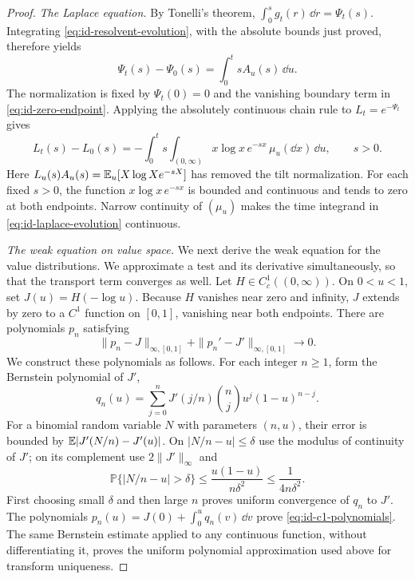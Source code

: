 \begin{proof}
\medskip\noindent\emph{The Laplace equation.}
By Tonelli's theorem, $\int_0^s g_t(r)\,\dd r=\Psi_t(s)$.
Integrating \eqref{eq:id-resolvent-evolution}, with the absolute bounds just proved, therefore yields
\begin{equation}
 \Psi_t(s)-\Psi_0(s)=\int_0^t sA_u(s)\,\dd u.
 \label{eq:id-exponent-evolution}
\end{equation}
The normalization is fixed by $\Psi_t(0)=0$ and the vanishing boundary term in \eqref{eq:id-zero-endpoint}.
Applying the absolutely continuous chain rule to $L_t=e^{-\Psi_t}$ gives
\begin{equation}
 L_t(s)-L_0(s)
 =-\int_0^t s\int_{(0,\infty)}x\log x\,e^{-sx}\,\mu_u(\dd x)\,\dd u,
 \qquad s>0.
 \label{eq:id-laplace-evolution}
\end{equation}
Here $L_u(s)A_u(s)=\mathbb E_u[X\log X e^{-sX}]$ has removed the tilt normalization.
For each fixed $s>0$, the function $x\log x\,e^{-sx}$ is bounded and continuous and tends to zero at both endpoints.
Narrow continuity of $(\mu_u)$ makes the time integrand in \eqref{eq:id-laplace-evolution} continuous.

\medskip\noindent\emph{The weak equation on value space.}
We next derive the weak equation for the value distributions.
We approximate a test and its derivative simultaneously, so that the transport term converges as well.
Let $H\in C_c^1((0,\infty))$.
On $0<u<1$, set $J(u)=H(-\log u)$.
Because $H$ vanishes near zero and infinity, $J$ extends by zero to a $C^1$ function on $[0,1]$, vanishing near both endpoints.
There are polynomials $p_n$ satisfying
\begin{equation}
 \|p_n-J\|_{\infty,[0,1]}+
 \|p_n'-J'\|_{\infty,[0,1]}\longrightarrow0.
 \label{eq:id-c1-polynomials}
\end{equation}
We construct these polynomials as follows.
For each integer $n\ge1$, form the Bernstein polynomial of $J'$,
\[
 q_n(u)=\sum_{j=0}^n J'(j/n)\binom{n}{j}u^j(1-u)^{n-j}.
\]
For a binomial random variable $N$ with parameters $(n,u)$, their error is bounded by $\mathbb E|J'(N/n)-J'(u)|$.
On $|N/n-u|\le\delta$ use the modulus of continuity of $J'$; on its complement use $2\|J'\|_\infty$ and
\[
 \mathbb P\{|N/n-u|>\delta\}
 \le\frac{u(1-u)}{n\delta^2}\le\frac1{4n\delta^2}.
\]
First choosing small $\delta$ and then large $n$ proves uniform convergence of $q_n$ to $J'$.
The polynomials $p_n(u)=J(0)+\int_0^u q_n(v)\,\dd v$ prove \eqref{eq:id-c1-polynomials}.
The same Bernstein estimate applied to any continuous function, without differentiating it, proves the uniform polynomial approximation used above for transform uniqueness.


\end{proof}
